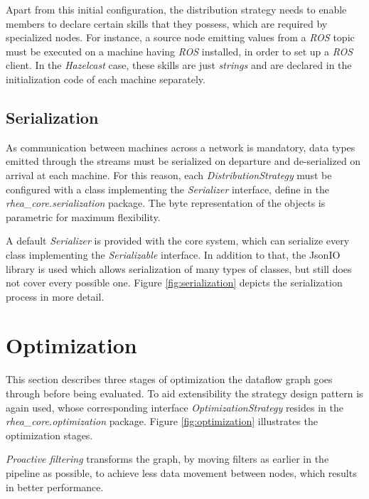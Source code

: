 \documentclass[sigplan,review,anonymous]{acmart}\settopmatter{printfolios=true,printacmref=false}
\begin{document}
Apart from this initial configuration, the distribution strategy needs to enable members to declare certain skills that they possess, which are required by specialized nodes. For instance, a source node emitting values from a \textit{ROS} topic must be executed on a machine having \textit{ROS} installed, in order to set up a \textit{ROS} client. In the \textit{Hazelcast} case, these skills are just \textit{strings} and are declared in the initialization code of each machine separately.

\subsection{Serialization}

As communication between machines across a network is mandatory, data types emitted through the streams must be serialized on departure and de-serialized on arrival at each machine. For this reason, each \textit{DistributionStrategy} must be configured with a class implementing the \textit{Serializer} interface, define in the \textit{rhea\_core.serialization} package. The byte representation of the objects is parametric for maximum flexibility.

A default \textit{Serializer} is provided with the core system, which can serialize every class implementing the \textit{Serializable} interface. In addition to that, the JsonIO library is used which allows serialization of many types of classes, but still does not cover every possible one. Figure \ref{fig:serialization} depicts the serialization process in more detail.


\section{Optimization} \label{sec:optimization}

This section describes three stages of optimization the dataflow graph goes through before being evaluated. To aid extensibility  the strategy design pattern is again used, whose corresponding interface \textit{OptimizationStrategy} resides in the \textit{rhea\_core.optimization} package. Figure \ref{fig:optimization} illustrates the optimization stages.


\textit{Proactive filtering} transforms the graph, by moving filters as earlier in the pipeline as possible, to achieve less data movement between nodes, which results in better performance.
\end{document}
